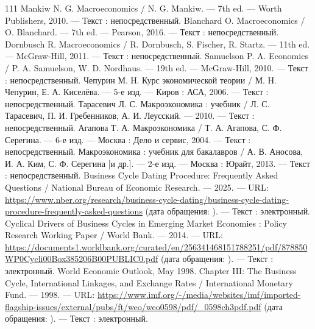\begin{RaggedRight}
\begin{thebibliography}{111}
     \hypertarget{bib:Mankiw-2010}{} Mankiw N. G. Macroeconomics / N. G. Mankiw. --- 7th ed. --- Worth Publishers, 2010. --- Текст : непосредственный.
     \hypertarget{bib:Blanchard-2016}{} Blanchard O. Macroeconomics / O. Blanchard. --- 7th ed. --- Pearson, 2016. --- Текст : непосредственный.
     \hypertarget{bib:Dornbusch-2011}{} Dornbusch R. Macroeconomics / R. Dornbusch, S. Fischer, R. Startz. --- 11th ed. --- McGraw-Hill, 2011. --- Текст : непосредственный.
     \hypertarget{bib:Samuelson-2010}{} Samuelson P. A. Economics / P. A. Samuelson, W. D. Nordhaus. --- 19th ed. --- McGraw-Hill, 2010. --- Текст : непосредственный.
     \hypertarget{bib:Чепурин-2006}{} Чепурин М. Н. Курс экономической теории / М. Н. Чепурин, Е. А. Киселёва. --- 5-е изд. --- Киров : АСА, 2006. --- Текст : непосредственный.
     \hypertarget{bib:Тарасевич-2010}{} Тарасевич Л. С. Макроэкономика : учебник / Л. С. Тарасевич, П. И. Гребенников, А. И. Леусский. --- 2010. --- Текст : непосредственный.
     \hypertarget{bib:Агапова-2004}{} Агапова Т. А. Макроэкономика / Т. А. Агапова, С. Ф. Серегина. --- 6-е изд. --- Москва : Дело и сервис, 2004. --- Текст : непосредственный.
     \hypertarget{bib:Аносова-2013}{} Макроэкономика : учебник для бакалавров / А. В. Аносова, И. А. Ким, С. Ф. Серегина [и др.]. --- 2-е изд. --- Москва : Юрайт, 2013. --- Текст : непосредственный.
     \hypertarget{bib:NBER-2025}{} Business Cycle Dating Procedure: Frequently Asked Questions / National Bureau of Economic Research. --- 2025. --- URL: \url{https://www.nber.org/research/business-cycle-dating/business-cycle-dating-procedure-frequently-asked-questions} (дата обращения: \bibaccessdate). --- Текст : электронный.
     \hypertarget{bib:WB-2014}{} Cyclical Drivers of Business Cycles in Emerging Market Economies : Policy Research Working Paper / World Bank. --- 2014. --- URL: \url{https://documents1.worldbank.org/curated/en/256341468151788251/pdf/878850WP0Cycli00Box385206B00PUBLIC0.pdf} (дата обращения: \bibaccessdate). --- Текст : электронный.
     \hypertarget{bib:IMF-1998}{} World Economic Outlook, May 1998. Chapter III: \textquotedbl{}The Business Cycle, International Linkages, and Exchange Rates\textquotedbl{} / International Monetary Fund. --- 1998. --- URL: \url{https://www.imf.org/-/media/websites/imf/imported-flagship-issues/external/pubs/ft/weo/weo0598/pdf/_0598ch3pdf.pdf} (дата обращения: \bibaccessdate). --- Текст : электронный.

\end{thebibliography}
\end{RaggedRight}
